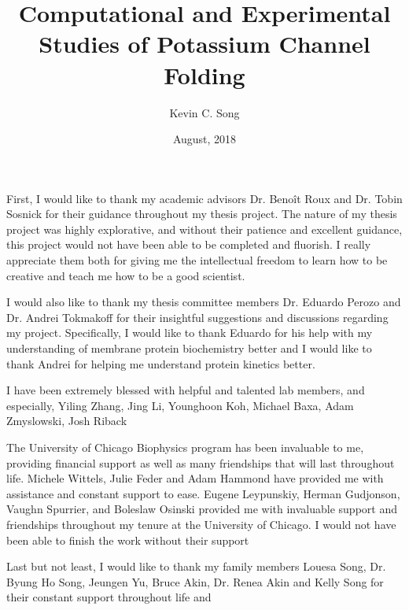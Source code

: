 \documentclass{ucetd}
\title{Computational and Experimental Studies of Potassium Channel Folding}
\author{Kevin C. Song}
\date{August, 2018}
\begin{document}
\maketitle

\makecopyright
\makededication
\makeepigraph


\tableofcontents
\listoffigures
\listoftables

\acknowledgments
First, I would like to thank my academic advisors Dr. Beno\^{i}t Roux and Dr. Tobin Sosnick for their guidance throughout my thesis project. The nature of my thesis project was highly explorative, and without their patience and excellent guidance, this project would not have been able to be completed and fluorish. I really appreciate them both for giving me the intellectual freedom to learn how to be creative and teach me how to be a good scientist.

I would also like to thank my thesis committee members Dr. Eduardo Perozo and Dr. Andrei Tokmakoff for their insightful suggestions and discussions regarding my project. Specifically, I would like to thank Eduardo for his help with my understanding of membrane protein biochemistry better and I would like to thank Andrei for helping me understand protein kinetics better.

I have been extremely blessed with helpful and talented lab members, and especially, Yiling Zhang, Jing Li, Younghoon Koh, Michael Baxa, Adam Zmyslowski, Josh Riback

The University of Chicago Biophysics program has been invaluable to me, providing financial support as well as many friendships that will last throughout life. Michele Wittels, Julie Feder and Adam Hammond have provided me with assistance and constant support to ease. Eugene Leypunskiy, Herman Gudjonson, Vaughn Spurrier, and Boleslaw Osinski provided me with invaluable support and friendships throughout my tenure at the University of Chicago. I would not have been able to finish the work without their support

Last but not least, I would like to thank my family members Louesa Song, Dr. Byung Ho Song, Jeungen Yu, Bruce Akin, Dr. Renea Akin and Kelly Song for their constant support throughout life and 
\end{document}
